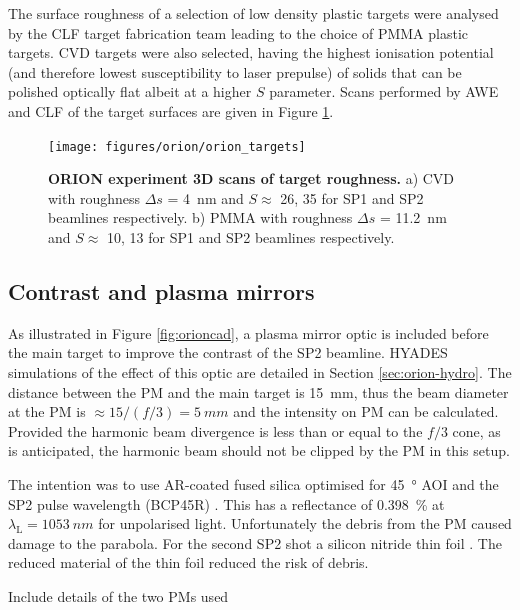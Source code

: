 The surface roughness of a selection of low density plastic targets were analysed by the CLF target fabrication team leading to the choice of PMMA plastic targets. CVD targets were also selected, having the highest ionisation potential (and therefore lowest susceptibility to laser prepulse) of solids that can be polished optically flat albeit at a higher $S$ parameter. Scans performed by AWE and CLF of the target surfaces are given in Figure \ref{fig:oriontargets}.
\begin{figure}
	\centering
	\texttt{[image: figures/orion/orion\_targets]}
	\caption[ORION HHG experiment targets]{\textbf{ORION experiment 3D scans of target roughness.} a) CVD with roughness $\Delta s$ = \qty{4}{nm} and $S \approx$ 26, 35 for SP1 and SP2 beamlines respectively. b) PMMA with roughness $\Delta s$ = \qty{11.2}{nm} and $S \approx$ 10, 13 for SP1 and SP2 beamlines respectively.}
	\label{fig:oriontargets}
\end{figure}

\subsection{Contrast and plasma mirrors}
As illustrated in Figure \ref{fig:orioncad}, a plasma mirror optic is included before the main target to improve the contrast of the SP2 beamline. HYADES simulations of the effect of this optic are detailed in Section \ref{sec:orion-hydro}. The distance between the PM and the main target is \qty{15}{mm}, thus the beam diameter at the PM is $\approx 15/(f/3) = \qty{5}{mm}$ and the intensity on PM can be calculated. Provided the harmonic beam divergence is less than or equal to the $f/3$ cone, as is anticipated, the harmonic beam should not be clipped by the PM in this setup. 

The intention was to use \ac{AR}-coated fused silica optimised for \qty{45}{\degree} \ac{AOI} and the SP2 pulse wavelength (BCP45R) \cite{45AOIBeamsplitter}. This has a reflectance of \qty{0.398}{\%} at $\lambda_\mathrm{L} = \qty{1053}{nm}$ for unpolarised light. Unfortunately the debris from the PM caused damage to the parabola. For the second SP2 shot a silicon nitride thin foil . The reduced material of the thin foil reduced the risk of debris.


Include details of the two PMs used



